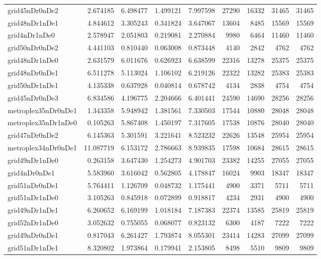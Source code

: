 \begin{longtable}{|l|r|r|r|r|r|r|r|r|}
grid45nDr0nDe2 & 2.674185 & 6.498477 & 1.499121 & 7.997598 & 27290 & 16332 & 31465 & 31465 \\
grid48nDr1nDe1 & 4.844612 & 3.305243 & 0.341824 & 3.647067 & 13604 & 8485 & 15569 & 15569 \\
grid4nDr1nDe0 & 2.578947 & 2.051803 & 0.219081 & 2.270884 & 9980 & 6464 & 11460 & 11460 \\
grid50nDr0nDe2 & 4.441103 & 0.810440 & 0.063008 & 0.873448 & 4140 & 2842 & 4762 & 4762 \\
grid48nDr1nDe0 & 2.631579 & 6.011676 & 0.626923 & 6.638599 & 22316 & 13278 & 25375 & 25375 \\
grid48nDr0nDe1 & 6.511278 & 5.113024 & 1.106102 & 6.219126 & 22322 & 13282 & 25383 & 25383 \\
grid50nDr1nDe1 & 4.135338 & 0.637928 & 0.040814 & 0.678742 & 4134 & 2838 & 4754 & 4754 \\
grid45nDr0nDe3 & 6.834586 & 4.196775 & 2.204666 & 6.401441 & 24590 & 14690 & 28256 & 28256 \\
metroplex35nDr0nDe1 & 1.343358 & 5.948942 & 1.381561 & 7.330503 & 17544 & 10880 & 28048 & 28048 \\
metroplex35nDr1nDe0 & 0.105263 & 5.867408 & 1.450197 & 7.317605 & 17538 & 10876 & 28040 & 28040 \\
grid47nDr0nDe2 & 6.145363 & 5.301591 & 3.221641 & 8.523232 & 22626 & 13548 & 25954 & 25954 \\
metroplex34nDr0nDe1 & 11.087719 & 6.153172 & 2.786663 & 8.939835 & 17598 & 10684 & 28615 & 28615 \\
grid49nDr1nDe0 & 0.263158 & 3.647430 & 1.254273 & 4.901703 & 23382 & 14255 & 27055 & 27055 \\
grid4nDr0nDe1 & 5.583960 & 3.616042 & 0.562805 & 4.178847 & 16024 & 9903 & 18347 & 18347 \\
grid51nDr0nDe1 & 5.764411 & 1.126709 & 0.048732 & 1.175441 & 4900 & 3371 & 5711 & 5711 \\
grid51nDr1nDe0 & 3.105263 & 0.845918 & 0.072899 & 0.918817 & 4234 & 2931 & 4900 & 4900 \\
grid49nDr1nDe1 & 6.260652 & 6.169199 & 1.018184 & 7.187383 & 22374 & 13585 & 25819 & 25819 \\
grid52nDr1nDe0 & 3.052632 & 0.755055 & 0.068077 & 0.823132 & 6300 & 4187 & 7222 & 7222 \\
grid49nDr0nDe1 & 0.817043 & 6.261427 & 1.793874 & 8.055301 & 23414 & 14283 & 27099 & 27099 \\
grid51nDr1nDe1 & 8.320802 & 1.973864 & 0.179941 & 2.153805 & 8498 & 5510 & 9809 & 9809 \\

\end{longtable}
